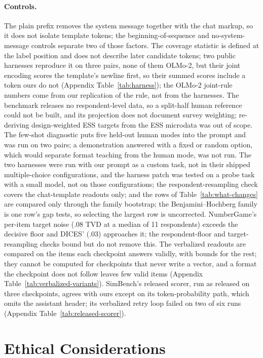 \documentclass[11pt]{article}
\begin{document}
\paragraph{Controls.}
The plain prefix removes the system message together with the chat markup, so
it does not isolate template tokens; the beginning-of-sequence and
no-system-message controls separate two of those factors. The coverage statistic is defined at the label position and does not describe later candidate tokens; two public harnesses reproduce it on three pairs, none of them OLMo-2, but their joint encoding scores the template's newline first, so their summed scores include a token ours do not (Appendix Table~\ref{tab:harness}); the OLMo-2 joint-rule numbers come from our replication of the rule, not from the harnesses. The benchmark releases no respondent-level data, so a split-half human reference could not be built, and its projection does not document survey weighting; re-deriving design-weighted ESS targets from the ESS microdata was out of scope. The few-shot diagnostic puts five held-out human modes into the prompt and was run on two pairs; a demonstration answered with a fixed or random option, which would separate format teaching from the human mode, was not run. The two harnesses were run with our prompt as a custom task, not in their shipped multiple-choice configurations, and the harness patch was tested on a probe task with a small model, not on those configurations; the respondent-resampling check covers the chat-template readouts only; and the rows of Table~\ref{tab:what-changes} are compared only through the family bootstrap; the Benjamini--Hochberg family is one row's gap tests, so selecting the largest row is uncorrected. NumberGame's per-item target noise (.08 TVD at a median of 11 respondents) exceeds the decisive floor and DICES' (.03) approaches it; the respondent-floor and target-resampling checks bound but do not remove this. The verbalized readouts are compared on the items each
checkpoint answers validly, with bounds for the rest; they cannot be computed for checkpoints that never write a vector, and a format the checkpoint does not follow leaves few valid items (Appendix Table~\ref{tab:verbalized-variants}). SimBench's released scorer, run as released on three checkpoints, agrees with ours except on its token-probability path, which omits the assistant header; its verbalized retry loop failed on two of six runs (Appendix Table~\ref{tab:released-scorer}).

\section*{Ethical Considerations}
\end{document}
